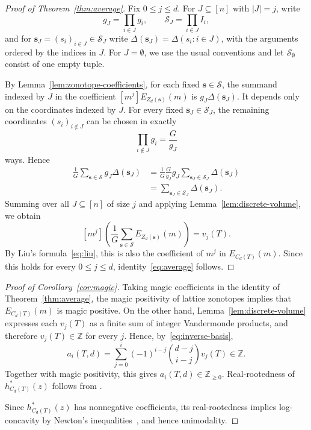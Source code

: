 \documentclass[a4paper,reqno,11pt,oneside]{amsart}
\newcommand{\Sc}{\mathcal{S}}
\newcommand{\ZZ}{\mathbb{Z}}
\theoremstyle{definition}
\theoremstyle{remark}
\begin{document}
\begin{proof}[Proof of Theorem~\ref{thm:average}]
Fix $0\le j\le d$. For $J\subseteq[n]$ with $|J|=j$, write
\[
g_J=\prod_{i\in J}g_i,
\qquad
\Sc_J=\prod_{i\in J}I_i,
\]
and for $\mathbf s_J=(s_i)_{i\in J}\in\Sc_J$ write $\Delta(\mathbf s_J)=\Delta(s_i:i\in J)$, with the arguments ordered by the indices in $J$. For $J=\emptyset$, we use the usual conventions and let $\Sc_{\emptyset}$ consist of one empty tuple.

By Lemma~\ref{lem:zonotope-coefficients}, for each fixed $\mathbf s\in\Sc$, the summand indexed by $J$ in the coefficient $[m^j]E_{Z_d(\mathbf s)}(m)$ is $g_J\Delta(\mathbf s_J)$. It depends only on the coordinates indexed by $J$. For every fixed $\mathbf s_J\in\Sc_J$, the remaining coordinates $(s_i)_{i\notin J}$ can be chosen in exactly
\[
\prod_{i\notin J}g_i=\frac{G}{g_J}
\]
ways. Hence
\begin{align*}
 \frac1G\sum_{\mathbf s\in\Sc}
       g_J\Delta(\mathbf s_J)
 &=\frac1G\frac{G}{g_J}g_J
       \sum_{\mathbf s_J\in\Sc_J}\Delta(\mathbf s_J)\\
 &=\sum_{\mathbf s_J\in\Sc_J}\Delta(\mathbf s_J).
\end{align*}
Summing over all $J\subseteq[n]$ of size $j$ and applying Lemma~\ref{lem:discrete-volume}, we obtain
\[
[m^j]\left(\frac1G\sum_{\mathbf s\in\Sc}E_{Z_d(\mathbf s)}(m)\right)=v_j(T).
\]
By Liu's formula~\eqref{eq:liu}, this is also the coefficient of $m^j$ in $E_{C_d(T)}(m)$. Since this holds for every $0\le j\le d$, identity~\eqref{eq:average} follows.
\end{proof}

\begin{proof}[Proof of Corollary~\ref{cor:magic}]
Taking magic coefficients in the identity of Theorem~\ref{thm:average}, the magic positivity of lattice zonotopes implies that $E_{C_d(T)}(m)$ is magic positive. On the other hand, Lemma~\ref{lem:discrete-volume} expresses each $v_j(T)$ as a finite sum of integer Vandermonde products, and therefore $v_j(T)\in\ZZ$ for every $j$. Hence, by~\eqref{eq:inverse-basis},
\[
a_i(T,d) = \sum_{j=0}^i(-1)^{i-j} \binom{d-j}{i-j}v_j(T)\in\ZZ.
\]
Together with magic positivity, this gives $a_i(T,d)\in\ZZ_{\ge0}$. Real-rootedness of $h^\ast_{C_d(T)}(z)$ follows from \cite[Theorem~4.19]{ferroni2024examples}. 

Since $h^\ast_{C_d(T)}(z)$ has nonnegative coefficients, its real-rootedness implies log-concavity by Newton's inequalities~\cite{stanley1989log}, and hence unimodality.
\end{proof}
\end{document}
